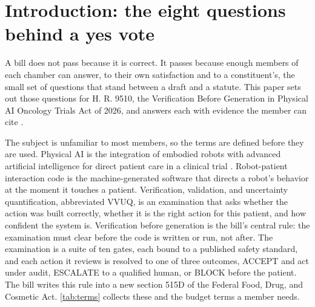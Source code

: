 \section{Introduction: the eight questions behind a yes vote}
\label{sec:intro}

A bill does not pass because it is correct. It passes because enough members of each
chamber can answer, to their own satisfaction and to a constituent's, the small set
of questions that stand between a draft and a statute. This paper sets out those
questions for H. R. 9510, the Verification Before Generation in Physical AI Oncology
Trials Act of 2026, and answers each with evidence the member can cite
\cite{Kawchak2026HR9510Bill}.

The subject is unfamiliar to most members, so the terms are defined before they are
used. Physical AI is the integration of embodied robots with advanced artificial
intelligence for direct patient care in a clinical trial
\cite{Kawchak2026NationalPlatformPhysicalAI}. Robot-patient interaction code is the
machine-generated software that directs a robot's behavior at the moment it touches a
patient. Verification, validation, and uncertainty quantification, abbreviated VVUQ,
is an examination that asks whether the action was built correctly, whether it is the
right action for this patient, and how confident the system is. Verification before
generation is the bill's central rule: the examination must clear before the code is
written or run, not after. The examination is a suite of ten gates, each bound to a
published safety standard, and each action it reviews is resolved to one of three
outcomes, ACCEPT and act under audit, ESCALATE to a qualified human, or BLOCK before
the patient. The bill writes this rule into a new section 515D of the Federal Food,
Drug, and Cosmetic Act. \autoref{tab:terms} collects these and the budget terms a
member needs.

